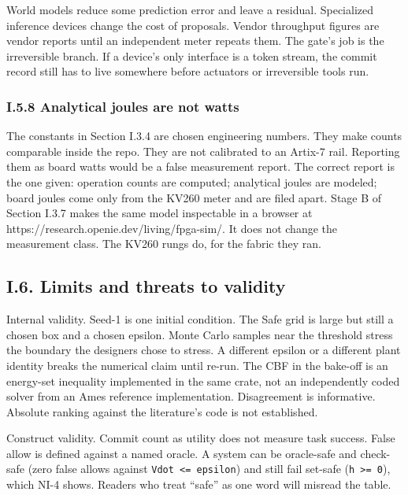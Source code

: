 \documentclass[
  10pt,
]{article}
\begin{document}
World models reduce some prediction error and leave a residual.
Specialized inference devices change the cost of proposals. Vendor
throughput figures are vendor reports until an independent meter repeats
them. The gate's job is the irreversible branch. If a device's only
interface is a token stream, the commit record still has to live
somewhere before actuators or irreversible tools run.

\subsubsection{I.5.8 Analytical joules are not
watts}\label{i.5.8-analytical-joules-are-not-watts}

The constants in Section I.3.4 are chosen engineering numbers. They make
counts comparable inside the repo. They are not calibrated to an Artix-7
rail. Reporting them as board watts would be a false measurement report.
The correct report is the one given: operation counts are computed;
analytical joules are modeled; board joules come only from the KV260
meter and are filed apart. Stage B of Section I.3.7 makes the same model
inspectable in a browser at
https://research.openie.dev/living/fpga-sim/. It does not change the
measurement class. The KV260 rungs do, for the fabric they ran.

\subsection{I.6. Limits and threats to
validity}\label{i.6.-limits-and-threats-to-validity}

Internal validity. Seed-1 is one initial condition. The Safe grid is
large but still a chosen box and a chosen epsilon. Monte Carlo samples
near the threshold stress the boundary the designers chose to stress. A
different epsilon or a different plant identity breaks the numerical
claim until re-run. The CBF in the bake-off is an energy-set inequality
implemented in the same crate, not an independently coded solver from an
Ames reference implementation. Disagreement is informative. Absolute
ranking against the literature's code is not established.

Construct validity. Commit count as utility does not measure task
success. False allow is defined against a named oracle. A system can be
oracle-safe and check-safe (zero false allows against
\texttt{Vdot\ \textless{}=\ epsilon}) and still fail set-safe
(\texttt{h\ \textgreater{}=\ 0}), which NI-4 shows. Readers who treat
``safe'' as one word will misread the table.
\end{document}
